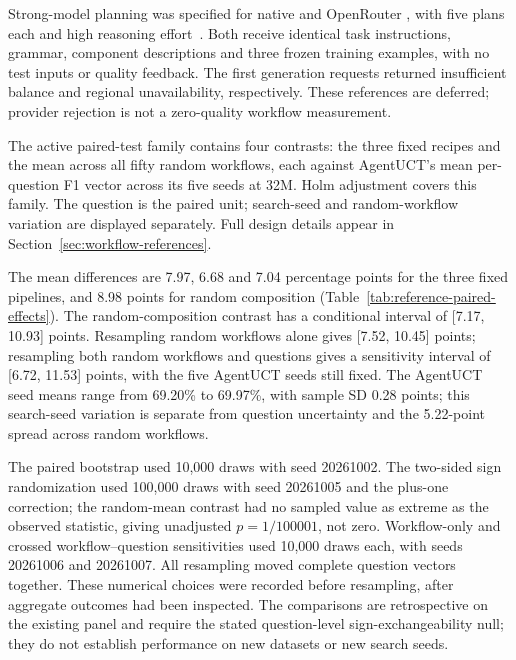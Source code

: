 Strong-model planning was specified for native  and
OpenRouter , with five plans each and high reasoning
effort~\citep{deepseek2026v4pro,openai2026gpt55}. Both receive identical task
instructions, grammar, component descriptions and three frozen training
examples, with no test inputs or quality feedback. The first generation
requests returned insufficient balance and regional unavailability,
respectively. These references are deferred; provider rejection is not a
zero-quality workflow measurement.

The active paired-test family contains four contrasts: the three fixed
recipes and the mean across all fifty random workflows, each against
AgentUCT's mean per-question F1 vector across its five seeds at 32M.
Holm adjustment covers this family.
The question is the paired unit; search-seed and random-workflow variation
are displayed separately. Full design details appear in
Section~\ref{sec:workflow-references}.

\begin{table}[t]
\centering\small\setlength{\tabcolsep}{3pt}
\caption{Question-paired reference comparisons at the fixed 32M endpoint.
$\Delta$ is AgentUCT's five-seed mean minus the reference. Intervals are
pointwise 95\% question-bootstrap intervals conditional on the observed
workflows; Holm adjusts only the four two-sided sign-randomization $p$ values.}
\label{tab:reference-paired-effects}

\end{table}

The mean differences are 7.97, 6.68 and 7.04 percentage points for the
three fixed pipelines, and 8.98 points for random composition
(Table~\ref{tab:reference-paired-effects}). The random-composition contrast
has a conditional interval of [7.17, 10.93] points. Resampling random
workflows alone gives [7.52, 10.45] points; resampling both random
workflows and questions gives a sensitivity interval of [6.72, 11.53] points,
with the five AgentUCT seeds still fixed. The AgentUCT seed means range
from 69.20\% to 69.97\%, with sample SD 0.28 points; this search-seed
variation is separate from question uncertainty and the 5.22-point spread
across random workflows.

The paired bootstrap used 10,000 draws with seed 20261002. The two-sided
sign randomization used 100,000 draws with seed 20261005 and the
plus-one correction; the random-mean contrast had no sampled value as
extreme as the observed statistic, giving unadjusted $p=1/100001$, not zero.
Workflow-only and crossed workflow--question sensitivities used 10,000
draws each, with seeds 20261006 and 20261007. All resampling moved complete
question vectors together. These numerical choices were recorded before
resampling, after aggregate outcomes had been inspected. The comparisons
are retrospective on the existing panel and require the stated
question-level sign-exchangeability null; they do not establish performance
on new datasets or new search seeds.

